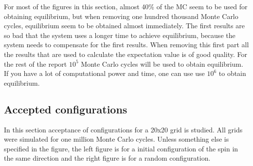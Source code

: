 For most of the figures in this section, almost 40\% of the MC seem to be used for obtaining equilibrium, but when removing one hundred thousand Monte Carlo cycles, equilibrium seem to be obtained almost immediately. The first results are so bad that the system uses a longer time to achieve equilibrium, because the system needs to compensate for the first results. When removing this first part all the results that are used to calculate the expectation value is of good quality. For the rest of the report $10^5$ Monte Carlo cycles will be used to obtain equilibrium. If you have a lot of computational power and time, one can use use $10^6$ to obtain equilibrium. 



















\pagebreak
\subsection{Accepted configurations}

In this section acceptance of configurations for a 20x20 grid is studied. All grids were simulated for one million Monte Carlo cycles. Unless something else is specified in the figure, the left figure is for a initial configuration of the spin in the same direction and the right figure is for a random configuration. 

